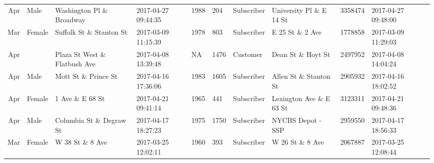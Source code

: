 \documentclass[11pt]{article}
\begin{document}
\begin{tabular}{r|llllllllll}
	 Apr                              & Male                             & Washington Pl \& Broadway       & 2017-04-27 09:44:35              & 1988                             &  204                             & Subscriber                       & University Pl \& E 14 St        & 3358474                          & 2017-04-27 09:48:00             \\
	 Mar                              & Female                           & Suffolk St \& Stanton St        & 2017-03-09 11:15:39              & 1978                             &  803                             & Subscriber                       & E 25 St \& 2 Ave                & 1778858                          & 2017-03-09 11:29:03             \\
	 Apr                              &                                  & Plaza St West \& Flatbush Ave   & 2017-04-08 13:39:48              &   NA                             & 1476                             & Customer                         & Dean St \& Hoyt St              & 2497952                          & 2017-04-08 14:04:24             \\
	 Apr                              & Male                             & Mott St \& Prince St            & 2017-04-16 17:36:06              & 1983                             & 1605                             & Subscriber                       & Allen St \& Stanton St          & 2905932                          & 2017-04-16 18:02:52             \\
	 Apr                              & Female                           & 1 Ave \& E 68 St                & 2017-04-21 09:41:14              & 1965                             &  441                             & Subscriber                       & Lexington Ave \& E 63 St        & 3123311                          & 2017-04-21 09:48:36             \\
	 Apr                              & Male                             & Columbia St \& Degraw St        & 2017-04-17 18:27:23              & 1975                             & 1750                             & Subscriber                       & NYCBS Depot - SSP                & 2959550                          & 2017-04-17 18:56:33             \\
	 Mar                              & Female                           & W 38 St \& 8 Ave                & 2017-03-25 12:02:11              & 1960                             &  393                             & Subscriber                       & W 26 St \& 8 Ave                & 2067887                          & 2017-03-25 12:08:44             \\

\end{tabular}
\end{document}
